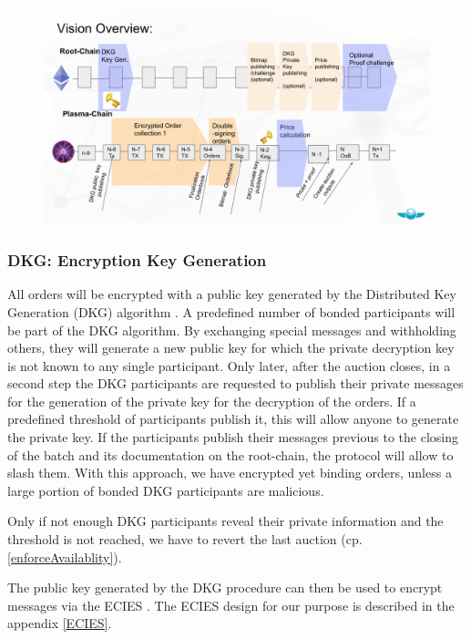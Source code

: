 \documentclass[11pt,parskip=full]{scrartcl}%
\begin{document}
\begin{figure}
\centering
\includegraphics[width=\textwidth]{overview_tradeflow.png}
\end{figure}



\subsubsection{DKG: Encryption Key Generation}
All orders will be encrypted with a public key generated by the Distributed Key Generation (DKG) algorithm \cite{DKG}. 
A predefined number of bonded participants will be part of the DKG algorithm. 
By exchanging special messages and withholding others, they will generate a new public key for which the private decryption key is not known to any single participant. 
Only later, after the auction closes, in a second step the DKG participants are requested to publish their private messages for the generation of the private key for the decryption of the orders.
If a predefined threshold of participants publish it, this will allow anyone to generate the private key. 
If the participants publish their messages previous to the closing of the batch and its documentation on the root-chain, the protocol will allow to slash them. 
With this approach, we have encrypted yet binding orders, unless a large portion of bonded DKG participants are malicious. 

Only if not enough DKG participants reveal their private information and the threshold is not reached, we have to revert the last auction (cp. \ref{enforceAvailablity}).


The public key generated by the DKG procedure can then be used to encrypt messages via the ECIES \cite{ECIES}. 
The ECIES design for our purpose is described in the appendix \ref{ECIES}.
\end{document}
